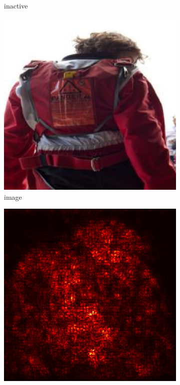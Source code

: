 \documentclass[preprint,12pt]{elsarticle}
\begin{document}
\begin{figure}
\begin{subfigure}{0.14\textwidth}
        \caption{inactive}
    \end{subfigure}
    \hfill
    \begin{subfigure}{0.14\linewidth}
        \centering
        \includegraphics[width=\linewidth]{../visualizations/examples/imagenette/resnet18/images/8.png}
        \caption{image}
    \end{subfigure}
    \hfill
    \begin{subfigure}{0.14\linewidth}
        \centering
        \includegraphics[width=\linewidth]{../visualizations/examples/imagenette/resnet18/saliency_map/8.png}

\end{subfigure}
\end{figure}
\end{document}
